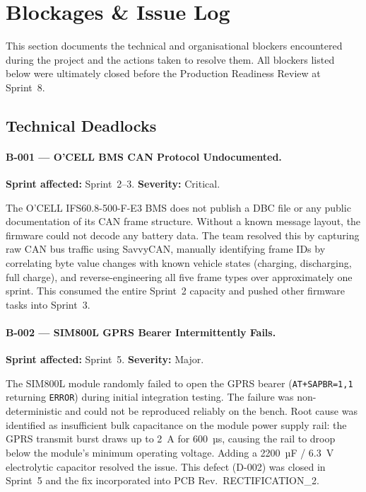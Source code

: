 \section{Blockages \& Issue Log}

This section documents the technical and organisational blockers encountered during the project and the actions taken to resolve them. All blockers listed below were ultimately closed before the Production Readiness Review at Sprint~8.

\subsection{Technical Deadlocks}

\paragraph{B-001 --- O'CELL BMS CAN Protocol Undocumented.}
\textbf{Sprint affected:} Sprint~2--3. \textbf{Severity:} Critical.

The O'CELL IFS60.8-500-F-E3 BMS does not publish a DBC file or any public documentation of its CAN frame structure. Without a known message layout, the firmware could not decode any battery data. The team resolved this by capturing raw CAN bus traffic using SavvyCAN, manually identifying frame IDs by correlating byte value changes with known vehicle states (charging, discharging, full charge), and reverse-engineering all five frame types over approximately one sprint. This consumed the entire Sprint~2 capacity and pushed other firmware tasks into Sprint~3.

\paragraph{B-002 --- SIM800L GPRS Bearer Intermittently Fails.}
\textbf{Sprint affected:} Sprint~5. \textbf{Severity:} Major.

The SIM800L module randomly failed to open the GPRS bearer (\texttt{AT+SAPBR=1,1} returning \texttt{ERROR}) during initial integration testing. The failure was non-deterministic and could not be reproduced reliably on the bench. Root cause was identified as insufficient bulk capacitance on the module power supply rail: the GPRS transmit burst draws up to 2~A for 600~µs, causing the rail to droop below the module's minimum operating voltage. Adding a 2200~µF / 6.3~V electrolytic capacitor resolved the issue. This defect (D-002) was closed in Sprint~5 and the fix incorporated into PCB Rev.~RECTIFICATION\_2.

